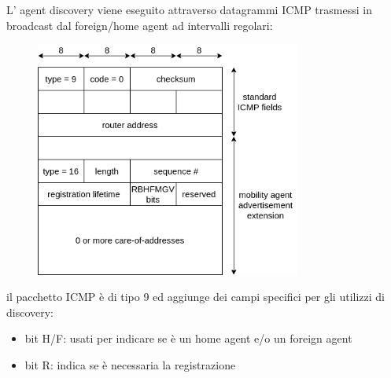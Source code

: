 L' agent discovery viene eseguito attraverso datagrammi ICMP trasmessi in broadcast dal foreign/home agent ad intervalli regolari:
\begin{figure}[H]
    \centering
    \includegraphics[width=330px]{images/8_Wireless_Mobile/agent_discovery.png}
\end{figure}
il pacchetto ICMP è di tipo 9 ed aggiunge dei campi specifici per gli utilizzi di discovery:
\begin{itemize}
    \item bit H/F: usati per indicare se è un home agent e/o un foreign agent
    \item bit R: indica se è necessaria la registrazione
\end{itemize}

